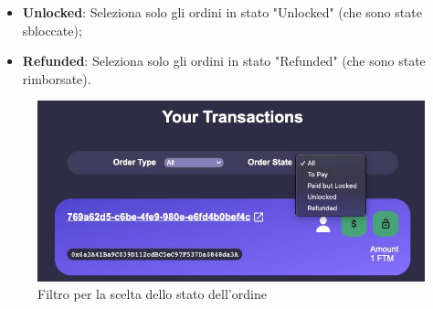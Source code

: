 \begin{itemize}
\begin{itemize}
                \item \textbf{Unlocked}: Seleziona solo gli ordini in stato "Unlocked" (che sono state sbloccate);
                \item \textbf{Refunded}: Seleziona solo gli ordini in stato "Refunded" (che sono state rimborsate).
            \end{itemize}
            \begin{figure}[H]
                \centering
                \includegraphics[scale=0.4]{immagini/Transaction/orderstate.jpg}
                \caption{Filtro per la scelta dello stato dell'ordine}
            \end{figure}
        \end{itemize}
        
